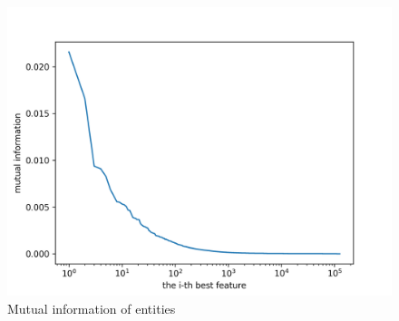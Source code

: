 \begin{figure}[ht]\centering
\includegraphics[width=130mm]{figures/entities.png}
\caption{Mutual information of entities}
\label{fig:mi_entities}
\end{figure}
